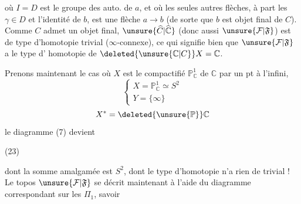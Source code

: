 où $I=D$ est le groupe des auto. de $a$, et où
les seules autres flèches, à part les $\gamma\in D$ et
l'identité de $b$, est une flèche $a\longrightarrow b$ (de
sorte que $b$ est objet final de $C$). Comme
$C$ admet un objet final, $\unsure{\widehat C|\widehat{\mathbb C}}$  (donc aussi
$\unsure{\mathcal F|\mathfrak F}$) est de type d'homotopie trivial ($\infty$-connexe),
ce qui signifie bien que $\unsure{\mathcal F|\mathfrak F}$ a le type d'
homotopie de $\deleted{\unsure{\mathbb C|C}}X=\mathbb C$.

Prenons maintenant le cas où $X$ est le
compactifié $\mathbb P^1_{\mathbb C}$ de $\mathbb C$ par un pt à l'infini,
\[
\left\{\begin{array}{l}
X=\mathbb P^1_{\mathbb C}\simeq S^2\\
Y=\{\infty\}
\end{array}\right.
\]
\[
X^*=\deleted{\unsure{\mathbb P}}\mathbb C
\]
le diagramme (7) devient

\noindent (23)

dont la somme amalgamée est $S^2$, dont
le type d'homotopie n'a rien de trivial !
Le topos $\unsure{\mathcal F|\mathfrak F}$ se décrit maintenant à
l'aide du diagramme correspondant sur les $\Pi_1$,
savoir
